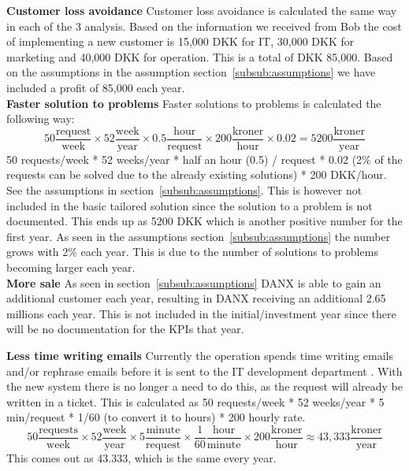 \textbf{Customer loss avoidance}
Customer loss avoidance is calculated the same way in each of the 3 analysis. Based on the information\cite{bob004} we received from Bob the cost of implementing a new customer is 15,000 DKK for IT, 30,000 DKK for marketing and 40,000 DKK for operation. This is a total of DKK 85,000. Based on the assumptions in the assumption section~\ref{subsub:assumptions} we have included a profit of 85,000 each year. \\

\textbf{Faster solution to problems}
Faster solutions to problems is calculated the following way:
\[ 50 \frac{\mathrm{request}}{\mathrm{week}} \times 52 \frac{\mathrm{week}}{\mathrm{year}} \times 0.5 \frac{\mathrm{hour}}{\mathrm{request}} \times 200 \frac{\mathrm{kroner}}{\mathrm{hour}} \times 0.02 = 5200 \frac{\mathrm{kroner}}{\mathrm{year}} \]
50 requests/week * 52 weeks/year * half an hour (0.5) / request * 0.02 (2\% of the requests can be solved due to the already existing solutions) * 200 DKK/hour. See the assumptions in section~\ref{subsub:assumptions}.
This is however not included in the basic tailored solution since the solution to a problem is not documented.
This ends up as 5200 DKK which is another positive number for the first year. As seen in the assumptions section~\ref{subsub:assumptions} the number grows with 2\% each year. This is due to the number of solutions to problems becoming larger each year.\\

\textbf{More sale}
As seen in section~\ref{subsub:assumptions} DANX is able to gain an additional customer each year, resulting in DANX receiving an additional 2.65 millions each year. This is not included in the initial/investment year since there will be no documentation for the KPIs that year.

\textbf{Less time writing emails}
Currently the operation spends time writing emails and/or rephrase emails before it is sent to the IT development department \cite{gert006} \cite{lasse003}. With the new system there is no longer a need to do this, as the request will already be written in a ticket. This is calculated as 50 requests/week * 52 weeks/year * 5 min/request * 1/60 (to convert it to hours) * 200 hourly rate.
\[ 50 \frac{\mathrm{requests}}{\mathrm{week}} \times 52 \frac{\mathrm{week}}{\mathrm{year}} \times 5\frac{\mathrm{minute}}{\mathrm{request}} \times \frac{1}{60} \frac{\mathrm{hour}}{\mathrm{minute}} \times 200\frac{\mathrm{kroner}}{\mathrm{hour}} \approx 43,333 \frac{\mathrm{kroner}}{\mathrm{year}} \]
This comes out as 43.333, which is the same every year.

